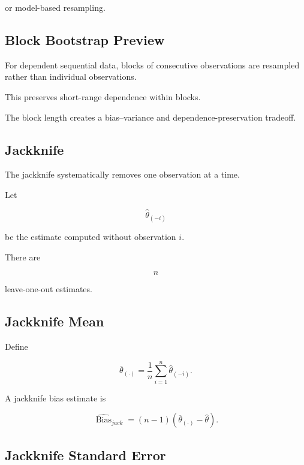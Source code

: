 or model-based resampling.

\subsection{Block Bootstrap Preview}
\label{subsec:block-bootstrap-preview}

For dependent sequential data, blocks of consecutive observations are
resampled rather than individual observations.

This preserves short-range dependence within blocks.

The block length creates a bias--variance and dependence-preservation
tradeoff.

\subsection{Jackknife}
\label{subsec:jackknife}

The jackknife systematically removes one observation at a time.

Let

\[
\widehat{\theta}_{(-i)}
\]

be the estimate computed without observation \(i\).

There are

\[
\boxed{
n
}
\]

leave-one-out estimates.

\subsection{Jackknife Mean}
\label{subsec:jackknife-mean}

Define

\[
\boxed{
\overline{\theta}_{(\cdot)}
=
\frac1n
\sum_{i=1}^{n}
\widehat{\theta}_{(-i)}.
}
\]

A jackknife bias estimate is

\[
\boxed{
\widehat{\operatorname{Bias}}_{jack}
=
(n-1)
\left(
\overline{\theta}_{(\cdot)}
-
\widehat{\theta}
\right).
}
\]

\subsection{Jackknife Standard Error}
\label{subsec:jackknife-standard-error}

